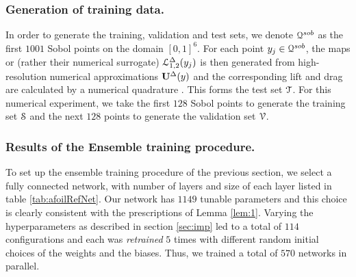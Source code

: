 \documentclass[a4paper]{article}
\numberwithin{equation}{section}
\numberwithin{equation}{section}
\theoremstyle{definition}
\theoremstyle{myremarkstyle}
\newcommand{\U}{{\bf U}}		%
\newcommand{\map}{\EuScript{L}}
\newcommand{\train}{\EuScript{S}}
\newcommand{\test}{\EuScript{T}}
\newcommand{\val}{\EuScript{V}}
\begin{document}
\subsubsection{Generation of training data.}
In order to generate the training, validation and test sets, we denote $\EuScript{Q}^{sob}$ as the first $1001$ Sobol points on the domain $[0,1]^6$. For each point $y_j \in\EuScript{Q}^{sob} $, the maps or (rather their numerical surrogate) $\map_{1,2}^{\Delta}(y_j)$ is then generated from high-resolution numerical approximations $\U^\Delta(y)$  and the corresponding lift and drag are calculated by a numerical quadrature . This forms the test set $\test$. For this numerical experiment, we take the first $128$ Sobol points to generate the training set $\train$ and the next $128$ points to generate the validation set $\val$.
\subsubsection{Results of the Ensemble training procedure.}
To set up the ensemble training procedure of the previous section, we select a fully connected network, with number of layers and size of each layer listed in table \ref{tab:afoilRefNet}. Our network has $1149$ tunable parameters and this choice is clearly consistent with the prescriptions of Lemma \ref{lem:1}. Varying the hyperparameters as described in section \ref{sec:imp} led to a total of $114$ configurations and each was \emph{retrained} $5$ times with different random initial choices of the weights and the biases. Thus, we trained a total of $570$ networks in parallel. 
\end{document}
